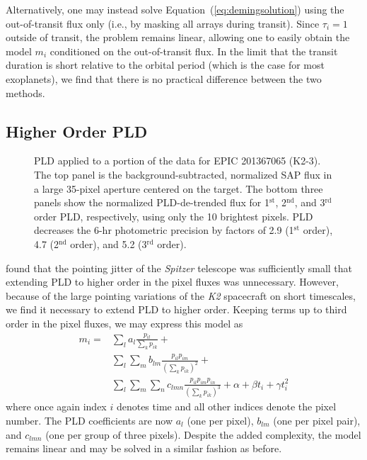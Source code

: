 \documentclass[]{emulateapj}
\begin{document}
Alternatively, one may instead solve Equation~(\ref{eq:demingsolution}) using the
out-of-transit flux only (i.e., by masking all arrays during transit). 
Since $\tau_i = 1$ outside of transit, the problem remains linear, allowing one to
easily obtain the model $m_i$ conditioned on the out-of-transit flux. In the limit that
the transit duration is short relative to the orbital period (which is the case for most
exoplanets), we find that there is no practical difference between the two methods.

\subsection{Higher Order PLD}
\label{sec:higherorder}
\begin{figure}[h]
  \begin{center}
       \caption{PLD applied to a portion of the data for EPIC 201367065 (K2-3). 
       The top panel is the background-subtracted, normalized SAP flux in a large 
       35-pixel aperture centered on the target. The bottom three panels show 
       the normalized PLD-de-trended flux for 1$^{\mathrm{st}}$, 2$^{\mathrm{nd}}$, and 
       3$^{\mathrm{rd}}$ order PLD, respectively, using only the 10 brightest pixels. 
       PLD decreases the 6-hr photometric precision by factors of 2.9 (1$^{\mathrm{st}}$ order), 4.7 
       (2$^{\mathrm{nd}}$ order), and 5.2 (3$^{\mathrm{rd}}$ order).\\[0.25in]}
     \label{fig:third_order}
  \end{center}
\end{figure}

\cite{DEM15} found that the pointing jitter of the \emph{Spitzer} telescope was 
sufficiently small that extending PLD to higher order in the pixel fluxes was
unnecessary. However, because of the large pointing variations of the \emph{K2}
spacecraft on short timescales, we find it necessary to extend PLD to higher order.
Keeping terms up to third order in the pixel fluxes, we may express this model as 
\begin{align}
\label{eq:pldmodel}
m_i = &\sum\limits_{l}a_l\frac{p_{il}}{\sum\limits_{k}p_{ik}} + \nonumber\\
      &\sum\limits_{l}\sum\limits_{m}b_{lm}\frac{p_{il}p_{im}}{(\sum\limits_{k}p_{ik})^2} + \nonumber\\
      &\sum\limits_{l}\sum\limits_{m}\sum\limits_{n}c_{lmn}\frac{p_{il}p_{im}p_{in}}{(\sum\limits_{k}p_{ik})^3} + \alpha + \beta t_i + \gamma t_i^2
\end{align}
where once again index $i$ denotes time and all other indices denote the pixel number. 
The PLD coefficients are now $a_l$ (one per pixel), 
$b_{lm}$ (one per pixel pair), and $c_{lmn}$ (one per group of three pixels). Despite
the added complexity, the model remains linear and may be solved in a similar fashion 
as before.
\end{document}
